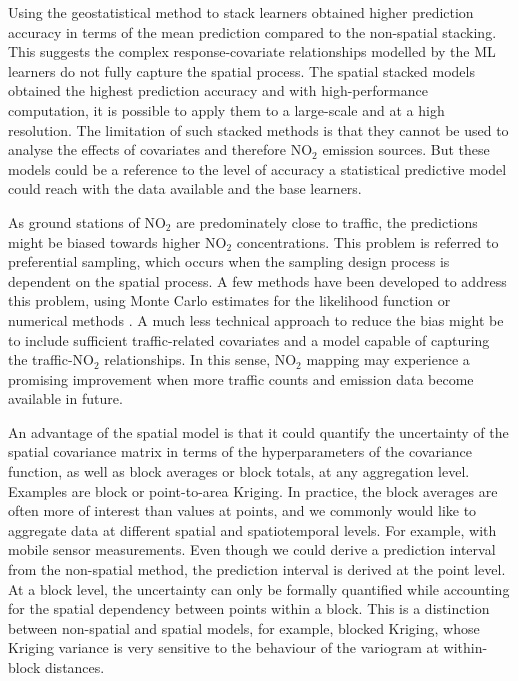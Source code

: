 \documentclass{article}
\begin{document}
Using the geostatistical method to stack learners obtained higher prediction accuracy in terms of the mean prediction compared to the non-spatial stacking. This suggests the complex response-covariate relationships modelled by the ML learners do not fully capture the spatial process. The  spatial stacked models obtained the highest prediction accuracy and with high-performance computation, it is possible to apply them to a large-scale and at a high resolution. The limitation of such stacked methods is that they cannot be used to analyse the effects of covariates and therefore NO$_2$ emission sources. But these models could be a reference to the level of accuracy a statistical predictive model could reach with the data available and the base learners.%

As ground stations of NO$_2$ are predominately close to traffic, the predictions might be biased towards higher NO$_2$ concentrations. This problem is referred to preferential sampling, which occurs when the sampling design process is dependent on the spatial process. A few methods have been developed to address this problem, using Monte Carlo estimates for the likelihood function \citep{diggle2010geostatistical} or numerical methods \citep{dinsdale2019methods}. %
A much less technical approach to reduce the bias might be to include sufficient traffic-related covariates and a model capable of capturing the traffic-NO$_2$ relationships. In this sense, NO$_2$ mapping may experience a promising improvement when more traffic counts and emission data become available in future.  

An advantage of the spatial model is that it could quantify the uncertainty of the spatial covariance matrix in terms of the hyperparameters of the covariance function, as well as block averages or block totals, at any aggregation level. Examples are block or point-to-area Kriging. In practice, the block averages are often more of interest than values at points, and we commonly would like to aggregate data at different spatial and spatiotemporal levels. For example, with mobile sensor measurements. Even though we could derive a prediction interval from the non-spatial method, the prediction interval is derived at the point level. At a block level, the uncertainty can only be formally quantified while accounting for the spatial dependency between points within a block. This is a distinction between non-spatial and spatial models, for example, blocked Kriging, whose Kriging variance is very sensitive to the behaviour of the variogram at within-block distances. 
\end{document}
